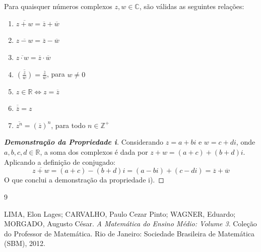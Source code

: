 \documentclass[12pt,a4paper]{article}
\begin{document}
\begin{teoremabox}
Para quaisquer números complexos $z, w \in \mathbb{C}$, são válidas as seguintes relações:
\begin{enumerate}[label=\roman*)]
    \item $\overline{z + w} = \overline{z} + \overline{w}$
    \item $\overline{z - w} = \overline{z} - \overline{w}$
    \item $\overline{z \cdot w} = \overline{z} \cdot \overline{w}$
    \item $\overline{\left(\frac{z}{w}\right)} = \frac{\overline{z}}{\overline{w}}$, para $w \neq 0$
    \item $z \in \mathbb{R} \iff z = \overline{z}$
    \item $\overline{\overline{z}} = z$
    \item $\overline{z^n} = (\overline{z})^n$, para todo $n \in \mathbb{Z}^+$
\end{enumerate}
\end{teoremabox}

\begin{proof}[\textbf{Demonstração da Propriedade i}]
Considerando $z = a + bi$ e $w = c + di$, onde $a, b, c, d \in \mathbb{R}$, a soma dos complexos é dada por $z + w = (a + c) + (b + d)i$. Aplicando a definição de conjugado:
\[
\overline{z + w} = (a + c) - (b + d)i = (a - bi) + (c - di) = \overline{z} + \overline{w}
\]
O que conclui a demonstração da propriedade i).
\end{proof}

\vspace{0.5cm}

\renewcommand{\refname}{Referências Bibliográficas}
\begin{thebibliography}{9}

LIMA, Elon Lages; CARVALHO, Paulo Cezar Pinto; WAGNER, Eduardo; MORGADO, Augusto César. \textit{A Matemática do Ensino Médio: Volume 3}. Coleção do Professor de Matemática. Rio de Janeiro: Sociedade Brasileira de Matemática (SBM), 2012.

\end{thebibliography}
\end{document}
